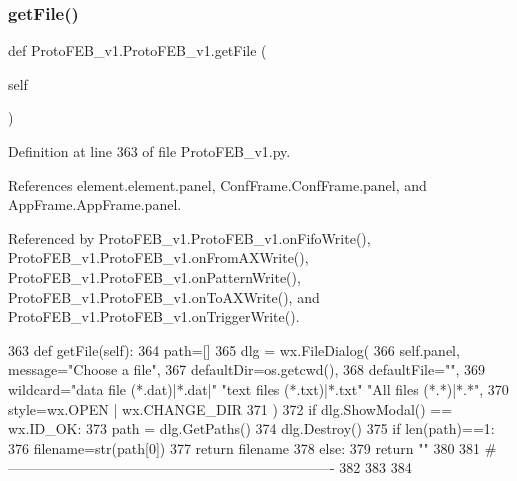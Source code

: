 \subsubsection{\texorpdfstring{get\+File()}{getFile()}}
{\footnotesize\ttfamily def Proto\+F\+E\+B\+\_\+v1.\+Proto\+F\+E\+B\+\_\+v1.\+get\+File (\begin{DoxyParamCaption}\item[{}]{self }\end{DoxyParamCaption})}



Definition at line 363 of file Proto\+F\+E\+B\+\_\+v1.\+py.



References element.\+element.\+panel, Conf\+Frame.\+Conf\+Frame.\+panel, and App\+Frame.\+App\+Frame.\+panel.



Referenced by Proto\+F\+E\+B\+\_\+v1.\+Proto\+F\+E\+B\+\_\+v1.\+on\+Fifo\+Write(), Proto\+F\+E\+B\+\_\+v1.\+Proto\+F\+E\+B\+\_\+v1.\+on\+From\+A\+X\+Write(), Proto\+F\+E\+B\+\_\+v1.\+Proto\+F\+E\+B\+\_\+v1.\+on\+Pattern\+Write(), Proto\+F\+E\+B\+\_\+v1.\+Proto\+F\+E\+B\+\_\+v1.\+on\+To\+A\+X\+Write(), and Proto\+F\+E\+B\+\_\+v1.\+Proto\+F\+E\+B\+\_\+v1.\+on\+Trigger\+Write().


\begin{DoxyCode}
363     \textcolor{keyword}{def }getFile(self):
364         path=[]
365         dlg = wx.FileDialog(
366             self.panel, message=\textcolor{stringliteral}{"Choose a file"},
367             defaultDir=os.getcwd(),
368             defaultFile=\textcolor{stringliteral}{""},
369             wildcard=\textcolor{stringliteral}{"data file (*.dat)|*.dat|"} \textcolor{stringliteral}{"text files (*.txt)|*.txt"} \textcolor{stringliteral}{"All files (*.*)|*.*"},
370             style=wx.OPEN | wx.CHANGE\_DIR
371             )
372         \textcolor{keywordflow}{if} dlg.ShowModal() == wx.ID\_OK:
373             path = dlg.GetPaths()
374         dlg.Destroy()
375         \textcolor{keywordflow}{if} len(path)==1:
376             filename=str(path[0])
377             \textcolor{keywordflow}{return} filename
378         \textcolor{keywordflow}{else}:
379             \textcolor{keywordflow}{return} \textcolor{stringliteral}{""}
380 
381 \textcolor{comment}{#----------------------------------------------------------------------}
382 
383 
384 
\end{DoxyCode}
\mbox{\label{classProtoFEB__v1_1_1ProtoFEB__v1_a86ddf60f41d52256f25276c39899b032}} 
